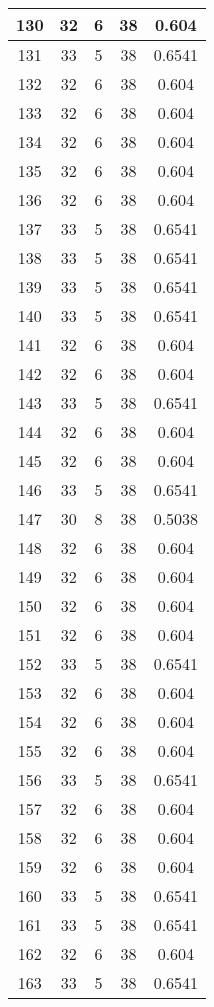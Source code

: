 \documentclass[letterpaper, 12pt]{article}
\begin{document}
\begin{longtable}{|c|c|c|c|c|}
\hline
130 & 32 & 6 & 38 & 0.604 \\
\hline
131 & 33 & 5 & 38 & 0.6541 \\
\hline
132 & 32 & 6 & 38 & 0.604 \\
\hline
133 & 32 & 6 & 38 & 0.604 \\
\hline
134 & 32 & 6 & 38 & 0.604 \\
\hline
135 & 32 & 6 & 38 & 0.604 \\
\hline
136 & 32 & 6 & 38 & 0.604 \\
\hline
137 & 33 & 5 & 38 & 0.6541 \\
\hline
138 & 33 & 5 & 38 & 0.6541 \\
\hline
139 & 33 & 5 & 38 & 0.6541 \\
\hline
140 & 33 & 5 & 38 & 0.6541 \\
\hline
141 & 32 & 6 & 38 & 0.604 \\
\hline
142 & 32 & 6 & 38 & 0.604 \\
\hline
143 & 33 & 5 & 38 & 0.6541 \\
\hline
144 & 32 & 6 & 38 & 0.604 \\
\hline
145 & 32 & 6 & 38 & 0.604 \\
\hline
146 & 33 & 5 & 38 & 0.6541 \\
\hline
147 & 30 & 8 & 38 & 0.5038 \\
\hline
148 & 32 & 6 & 38 & 0.604 \\
\hline
149 & 32 & 6 & 38 & 0.604 \\
\hline
150 & 32 & 6 & 38 & 0.604 \\
\hline
151 & 32 & 6 & 38 & 0.604 \\
\hline
152 & 33 & 5 & 38 & 0.6541 \\
\hline
153 & 32 & 6 & 38 & 0.604 \\
\hline
154 & 32 & 6 & 38 & 0.604 \\
\hline
155 & 32 & 6 & 38 & 0.604 \\
\hline
156 & 33 & 5 & 38 & 0.6541 \\
\hline
157 & 32 & 6 & 38 & 0.604 \\
\hline
158 & 32 & 6 & 38 & 0.604 \\
\hline
159 & 32 & 6 & 38 & 0.604 \\
\hline
160 & 33 & 5 & 38 & 0.6541 \\
\hline
161 & 33 & 5 & 38 & 0.6541 \\
\hline
162 & 32 & 6 & 38 & 0.604 \\
\hline
163 & 33 & 5 & 38 & 0.6541 \\
\hline

\end{longtable}
\end{document}
